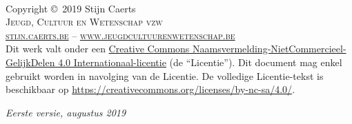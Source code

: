\documentclass[11pt,fleqn]{book} %
\begin{document}

\begingroup
\thispagestyle{empty} %
\vfill
\endgroup


\newpage
~\vfill
\thispagestyle{empty}
{
\selectfont

\noindent Copyright \copyright\ 2019 Stijn Caerts\\ %

\noindent \textsc{Jeugd, Cultuur en Wetenschap vzw}\\ %

\noindent \textsc{\href{https://stijn.caerts.be/}{stijn.caerts.be}} -- \textsc{\href{https://www.jeugdcultuurenwetenschap.be/}{www.jeugdcultuurenwetenschap.be}}\\ %

\noindent Dit werk valt onder een \href{https://creativecommons.org/licenses/by-nc-sa/4.0/deed.nl}{Creative Commons Naamsvermelding-NietCommercieel-GelijkDelen 4.0 Internationaal-licentie} (de ``Licentie''). Dit document mag enkel gebruikt worden in navolging van de Licentie. De volledige Licentie-tekst is beschikbaar op \url{https://creativecommons.org/licenses/by-nc-sa/4.0/}.\\

\noindent \href{https://creativecommons.org/licenses/by-nc-sa/4.0/}{\ccbyncsaeu}

\vspace{1cm}

\noindent \textit{Eerste versie, augustus 2019} %
}
\end{document}

